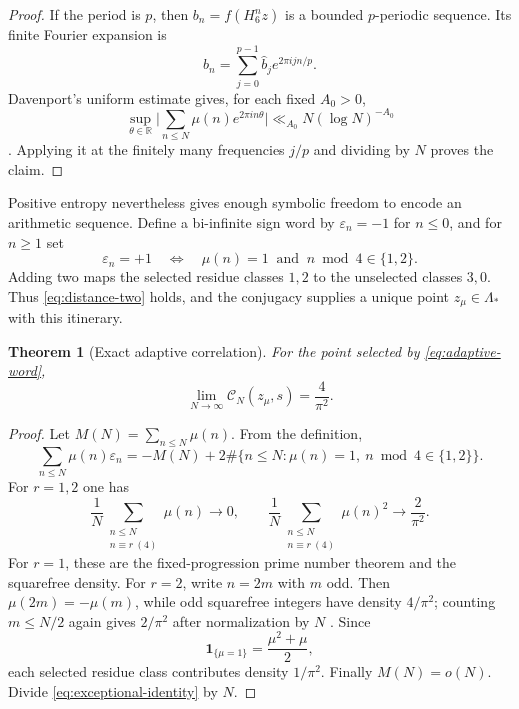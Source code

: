 \documentclass[11pt,a4paper]{article}
\newtheorem{theorem}{Theorem}[section]
\theoremstyle{remark}
\newcommand{\Mob}{\mu}
\newcommand{\Lam}{\Lambda_*}
\newcommand{\Hmap}{H_6}
\newcommand{\eps}{\varepsilon}
\newcommand{\cN}{\mathcal C_N}
\newcommand{\abs}[1]{\lvert#1\rvert}
\begin{document}
\begin{proof}
If the period is $p$, then $b_n=f(\Hmap^n z)$ is a bounded $p$-periodic
sequence.  Its finite Fourier expansion is
\[
 b_n=\sum_{j=0}^{p-1}\widehat b_j e^{2\pi ijn/p}.
\]
Davenport's uniform estimate gives, for each fixed $A_0>0$,
\[
 \sup_{\theta\in\mathbb R}
 \abs{\sum_{n\leq N}\Mob(n)e^{2\pi i n\theta}}
 \ll_{A_0}N(\log N)^{-A_0}
\]
\cite{Davenport1937,IwaniecKowalski2004}.  Applying it at the finitely many
frequencies $j/p$ and dividing by $N$ proves the claim.
\end{proof}

Positive entropy nevertheless gives enough symbolic freedom to encode an
arithmetic sequence.  Define a bi-infinite sign word by $\eps_n=-1$ for
$n\leq0$, and for $n\geq1$ set
\begin{equation}
 \eps_n=+1
 \quad\Longleftrightarrow\quad
 \Mob(n)=1\ \text{ and }\ n\bmod4\in\{1,2\}.
 \label{eq:adaptive-word}
\end{equation}
Adding two maps the selected residue classes $1,2$ to the unselected classes
$3,0$.  Thus \eqref{eq:distance-two} holds, and the conjugacy supplies a
unique point $z_{\Mob}\in\Lam$ with this itinerary.

\begin{theorem}[Exact adaptive correlation]
\label{thm:exceptional}
For the point selected by \eqref{eq:adaptive-word},
\begin{equation}
 \lim_{N\to\infty}\cN(z_{\Mob},s)=\frac4{\pi^2}.
 \label{eq:four-over-pi2}
\end{equation}
\end{theorem}

\begin{proof}
Let $M(N)=\sum_{n\leq N}\Mob(n)$.  From the definition,
\begin{equation}
 \sum_{n\leq N}\Mob(n)\eps_n
 =-M(N)+2\#\{n\leq N:\Mob(n)=1,\ n\bmod4\in\{1,2\}\}.
 \label{eq:exceptional-identity}
\end{equation}
For $r=1,2$ one has
\begin{equation}
 \frac1N\sum_{\substack{n\leq N\\n\equiv r\ (4)}}\Mob(n)\to0,
 \qquad
 \frac1N\sum_{\substack{n\leq N\\n\equiv r\ (4)}}\Mob(n)^2
 \to\frac2{\pi^2}.
 \label{eq:residue-density}
\end{equation}
For $r=1$, these are the fixed-progression prime number theorem and the
squarefree density.  For $r=2$, write $n=2m$ with $m$ odd.  Then
$\Mob(2m)=-\Mob(m)$, while odd squarefree integers have density $4/\pi^2$;
counting $m\leq N/2$ again gives $2/\pi^2$ after normalization by $N$
\cite{Mirsky1948}.  Since
\[
 \mathbf1_{\{\Mob=1\}}=\frac{\Mob^2+\Mob}{2},
\]
each selected residue class contributes density $1/\pi^2$.  Finally
$M(N)=o(N)$.  Divide \eqref{eq:exceptional-identity} by $N$.
\end{proof}
\end{document}
